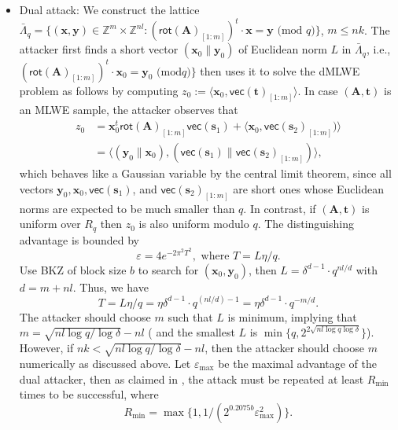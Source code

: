 \documentclass[conference]{IEEEtran}
\begin{document}
\begin{itemize}
			\item Dual attack: We construct the lattice $\bar{\Lambda}_q=\{(\mathbf{x},\mathbf{y}) \in \mathbb{Z}^{m}\times \mathbb{Z}^{nl}:( \textsf{rot}(\mathbf{A})_{[1:m]})^t \cdot \mathbf{x}=\mathbf{y} \text{ (mod } q)\}$, $m\leq nk$. The attacker first finds a short vector $(\mathbf{x}_0 \| \mathbf{y}_0)$ of Euclidean norm $L$ in $\bar{\Lambda}_q$, i.e.,   $(\textsf{rot}(\mathbf{A})_{[1:m]})^t \cdot \mathbf{x}_0=\mathbf{y}_0 \text{ (mod} q)\}$ then uses it to solve the \textsf{dMLWE} problem as follows by computing $z_0:=\langle \mathbf{x}_0, \textsf{vec}(\mathbf{t})_{[1:m]} \rangle$. In case $(\mathbf{A},\mathbf{t})$ is an \textsf{MLWE} sample, the attacker observes that  \begin{align*}
			z_0&=\mathbf{x}^t_0\textsf{rot}(\mathbf{A})_{[1:m]}\textsf{vec}(\mathbf{s}_1)+\langle\mathbf{x}_0,\textsf{vec}(\mathbf{s}_2)_{[1:m]})\rangle\\
			&=\langle(\mathbf{y}_0\|\mathbf{x}_0),(\textsf{vec}(\mathbf{s}_1)\| \textsf{vec}(\mathbf{s}_2)_{[1:m]})\rangle,
			\end{align*} which behaves like a Gaussian variable by the central limit theorem, since all vectors $\mathbf{y}_0, \mathbf{x}_0, \textsf{vec}(\mathbf{s}_1)$, and $ \textsf{vec}(\mathbf{s}_2)_{[1:m]}$ are short ones whose Euclidean norms are expected to be much smaller than $q$. In contrast, if $(\mathbf{A},\mathbf{t})$ is uniform over $R_q$ then $z_0$ is also uniform modulo $q$. The distinguishing advantage is bounded by 
			\begin{equation}\label{k5}
			\varepsilon=4e^{-2\pi^2T^2}, \text{ where } T=L\eta/q.
			\end{equation}
			Use BKZ of block size $b$ to search for $(\mathbf{x}_0,\mathbf{y}_0)$, then $L=\delta^{d-1}\cdot q^{nl/d}$ with $d=m+nl$. Thus, we have 
			\begin{equation}\label{k6}
			T=L\eta/q=\eta\delta^{d-1}\cdot q^{(nl/d)-1}=\eta\delta^{d-1}\cdot q^{-m/d}.
			\end{equation}
			The attacker should choose $m$ such that $L$ is minimum, implying that $m=\sqrt{nl\log q /\log \delta}-nl$ ( and  the smallest $L$ is $\min \{q, 2^{2\sqrt{nl \log q \log \delta}}\}$). However, if $nk < \sqrt{nl\log q /\log \delta}-nl$, then the attacker should choose $m$ numerically as discussed above. 
			Let $\varepsilon_{\text{max}}$ be the maximal advantage of the dual attacker, then as claimed in \cite[Subsection 4.2.4]{AAB+19}, the attack must be repeated at least $R_{\text{min}}$ times to be successful, where 
			\begin{equation}\label{k12}
			R_{\text{min}}=\max \{1, 1/(2^{0.2075b}\varepsilon_{\text{max}}^2)\}.
			\end{equation}
			

\end{itemize}
\end{document}
